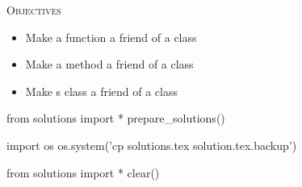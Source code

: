 
\textsc{Objectives}
\begin{itemize}
\item Make a function a friend of a class
\item Make a method a friend of a class
\item Make s class a friend of a class
\end{itemize}




\begin{python0}
from solutions import *
prepare_solutions()
\end{python0}
\begin{python}
import os
os.system('cp solutions.tex solution.tex.backup')  
\end{python}

\begin{python0}
from solutions import *
clear()
\end{python0}
